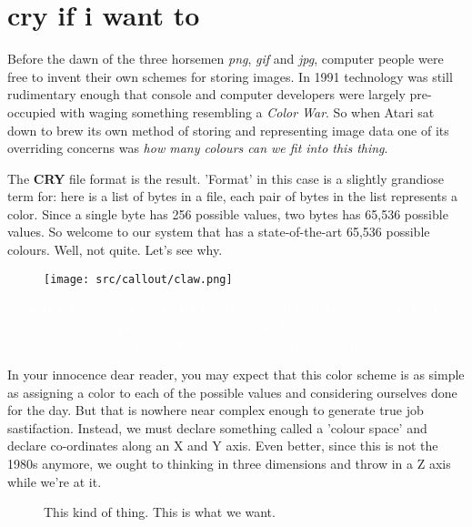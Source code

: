 \chapter{cry if i want to} 
\label{sec:listing}
\lstset{style=6502Style}
Before the dawn of the three horsemen \textit{png}, \textit{gif} and \textit{jpg}, computer people were free to invent their 
own schemes for storing images. In 1991 technology was still
rudimentary enough that console and computer developers were largely pre-occupied with waging something resembling a \textit{Color War}. So
when Atari sat down to brew its own method of storing and representing image data one of its overriding concerns was \textit{how many
colours can we fit into this thing}.

The \textbf{CRY} file format is the result. 'Format' in this case is a slightly grandiose term for: here is a list of bytes in a file,
each pair of bytes in the list represents a color. Since a single byte has 256 possible values, two bytes has 65,536 possible values.
So welcome to our system that has a state-of-the-art 65,536 possible colours. Well, not quite. Let's see why.

\begin{definition}
\setlength{\intextsep}{0pt}%
\setlength{\columnsep}{3pt}%
\begin{wrapfigure}{l}{0.12\textwidth}
\texttt{[image: src/callout/claw.png]} 
\end{wrapfigure}
\small
\textcolor{white}{
Good luck figuring out what CRY is an acryonym of. Maybe it refers to the three axes of the 'colour space': cyan, red, and yellow. 
Maybe it refers to the three components contained in each byte pair: color, radiance, and luminosity?
}
\end{definition}

In your innocence dear reader, you may expect that this color scheme is as simple as assigning a color to each of the possible values
and considering ourselves done for the day. But that is nowhere near complex enough to generate true job sastifaction. Instead, we must
declare something called a 'colour space' and declare co-ordinates along an X and Y axis. Even better, since this is not the 1980s
anymore, we ought to thinking in three dimensions and throw in a Z axis while we're at it.

\begin{figure}[H]
    \centering
    \begin{adjustbox}{width=7cm,center}
    \end{adjustbox}
\caption{This kind of thing. This is what we want.}
\end{figure}

